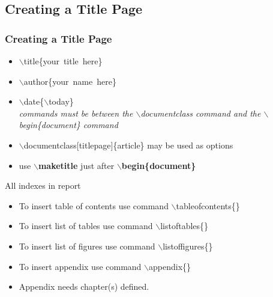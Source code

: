 \documentclass [9pt] {beamer}
\begin{document}
\subsection{Creating a Title Page}\label{Creating a Title Page}
\begin{frame}\frametitle{Creating a Title Page}
\rm
\fontsize{9pt}{11pt}\selectfont
\begin{itemize}
  \item $\backslash$title\{your\ title\ here\}\\[.20cm]
\item $\backslash$author\{your\ name\ here\}\\[.20cm]
\item $\backslash$date\{$\backslash$today\}\\[.20cm]
\emph{commands must be between the \textcolor[rgb]{0.98,0.00,0.00}{$\backslash$documentclass} command and the \textcolor[rgb]{0.98,0.00,0.00}{$\backslash$begin\{document\}} command}\\[.20cm]
\item \textcolor[rgb]{0.98,0.00,0.00}{$\backslash$documentclass[titlepage]\{article\}} may be used as options\\[.20cm]
\item use {\bf $\backslash$maketitle} just after {\bf $\backslash$begin\{document\}}\\[.20cm]

\end{itemize}
\end{frame}

\begin{frame}{All indexes in report}\label{report indexes}
\begin{itemize}
	\item To insert table of contents use command \textcolor[rgb]{0.98,0.00,0.00}{$\backslash$tableofcontents\{\}}\\[0.5cm]
	\item To insert list of tables use command \textcolor[rgb]{0.98,0.00,0.00}{$\backslash$listoftables\{\}}\\[0.5cm] 
	\item To insert list of figures use command \textcolor[rgb]{0.98,0.00,0.00}{$\backslash$listoffigures\{\}}\\[0.5cm]
	\item To insert appendix use command \textcolor[rgb]{0.98,0.00,0.00}{$\backslash$appendix\{\}}\\[0.5cm]  
	\item Appendix needs chapter(s) defined.
\end{itemize}
\end{frame}
\end{document}
